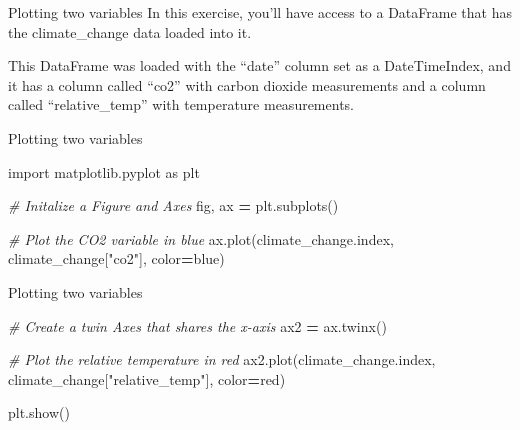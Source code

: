 \documentclass[
  ignorenonframetext,
]{beamer}
\newenvironment{Shaded}{\begin{snugshade}}{\end{snugshade}}
\newcommand{\CommentTok}[1]{\textcolor[rgb]{0.56,0.35,0.01}{\textit{#1}}}
\newcommand{\ImportTok}[1]{#1}
\newcommand{\NormalTok}[1]{#1}
\newcommand{\OperatorTok}[1]{\textcolor[rgb]{0.81,0.36,0.00}{\textbf{#1}}}
\newcommand{\StringTok}[1]{\textcolor[rgb]{0.31,0.60,0.02}{#1}}
\begin{document}
\begin{frame}{Plotting two variables}
\label{plotting-two-variables-2}
In this exercise, you'll have access to a DataFrame that has the
climate\_change data loaded into it.

This DataFrame was loaded with the ``date'' column set as a
DateTimeIndex, and it has a column called ``co2'' with carbon dioxide
measurements and a column called ``relative\_temp'' with temperature
measurements.
\end{frame}

\begin{frame}[fragile]{Plotting two variables}
\label{plotting-two-variables-3}

\begin{Shaded}
\begin{Highlighting}[]
\ImportTok{import}\NormalTok{ matplotlib.pyplot }\ImportTok{as}\NormalTok{ plt}

\CommentTok{\# Initalize a Figure and Axes}
\NormalTok{fig, ax }\OperatorTok{=}\NormalTok{ plt.subplots()}

\CommentTok{\# Plot the CO2 variable in blue}
\NormalTok{ax.plot(climate\_change.index, climate\_change[}\StringTok{"co2"}\NormalTok{], color}\OperatorTok{=}\StringTok{\textquotesingle{}blue\textquotesingle{}}\NormalTok{)}
\end{Highlighting}
\end{Shaded}
\end{frame}

\begin{frame}[fragile]{Plotting two variables}
\label{plotting-two-variables-4}

\begin{Shaded}
\begin{Highlighting}[]
\CommentTok{\# Create a twin Axes that shares the x{-}axis}
\NormalTok{ax2 }\OperatorTok{=}\NormalTok{ ax.twinx()}

\CommentTok{\# Plot the relative temperature in red}
\NormalTok{ax2.plot(climate\_change.index, climate\_change[}\StringTok{"relative\_temp"}\NormalTok{], color}\OperatorTok{=}\StringTok{\textquotesingle{}red\textquotesingle{}}\NormalTok{)}

\NormalTok{plt.show()}
\end{Highlighting}
\end{Shaded}
\end{frame}
\end{document}
